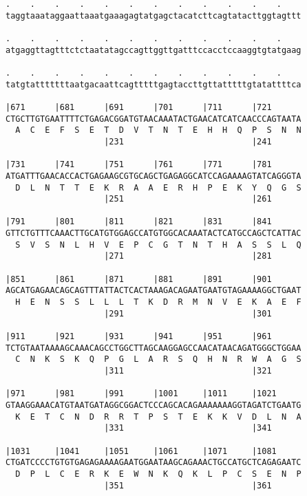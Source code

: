 \documentclass{article}
\begin{document}
\begin{Verbatim}
.    .    .    .    .    .    .    .    .    .    .    .    
taggtaaataggaattaaatgaaagagtatgagctacatcttcagtatacttggtagttt
                                                            
.    .    .    .    .    .    .    .    .    .    .    .    
atgaggttagtttctctaatatagccagttggttgatttccacctccaaggtgtatgaag
                                                            
.    .    .    .    .    .    .    .    .    .    .    .    
tatgtatttttttaatgacaattcagtttttgagtaccttgttatttttgtatattttca
                                                            
|671      |681      |691      |701      |711      |721      
CTGCTTGTGAATTTTCTGAGACGGATGTAACAAATACTGAACATCATCAACCCAGTAATA
  A  C  E  F  S  E  T  D  V  T  N  T  E  H  H  Q  P  S  N  N
                    |231                          |241      
  
|731      |741      |751      |761      |771      |781      
ATGATTTGAACACCACTGAGAAGCGTGCAGCTGAGAGGCATCCAGAAAAGTATCAGGGTA
  D  L  N  T  T  E  K  R  A  A  E  R  H  P  E  K  Y  Q  G  S
                    |251                          |261      
  
|791      |801      |811      |821      |831      |841      
GTTCTGTTTCAAACTTGCATGTGGAGCCATGTGGCACAAATACTCATGCCAGCTCATTAC
  S  V  S  N  L  H  V  E  P  C  G  T  N  T  H  A  S  S  L  Q
                    |271                          |281      
  
|851      |861      |871      |881      |891      |901      
AGCATGAGAACAGCAGTTTATTACTCACTAAAGACAGAATGAATGTAGAAAAGGCTGAAT
  H  E  N  S  S  L  L  L  T  K  D  R  M  N  V  E  K  A  E  F
                    |291                          |301      
  
|911      |921      |931      |941      |951      |961      
TCTGTAATAAAAGCAAACAGCCTGGCTTAGCAAGGAGCCAACATAACAGATGGGCTGGAA
  C  N  K  S  K  Q  P  G  L  A  R  S  Q  H  N  R  W  A  G  S
                    |311                          |321      
  
|971      |981      |991      |1001     |1011     |1021     
GTAAGGAAACATGTAATGATAGGCGGACTCCCAGCACAGAAAAAAAGGTAGATCTGAATG
  K  E  T  C  N  D  R  R  T  P  S  T  E  K  K  V  D  L  N  A
                    |331                          |341      
  
|1031     |1041     |1051     |1061     |1071     |1081     
CTGATCCCCTGTGTGAGAGAAAAGAATGGAATAAGCAGAAACTGCCATGCTCAGAGAATC
  D  P  L  C  E  R  K  E  W  N  K  Q  K  L  P  C  S  E  N  P
                    |351                          |361      
  

\end{Verbatim}
\end{document}
